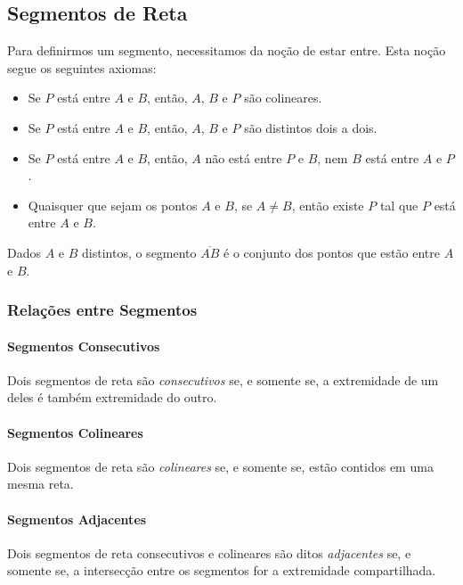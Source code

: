 \subsection{Segmentos de Reta}
Para definirmos um segmento, necessitamos da noção de estar entre. Esta noção segue os seguintes axiomas: \par 
\begin{itemize}
\item Se $P$ está entre $A$ e $B$, então, $A$, $B$ e $P$ são colineares.
\item Se $P$ está entre $A$ e $B$, então, $A$, $B$ e $P$ são distintos dois a dois.
\item Se $P$ está entre $A$ e $B$, então, $A$ não está entre $P$ e $B$, nem $B$ está entre $A$ e $P$.
\item Quaisquer que sejam os pontos $A$ e $B$, se $A \neq B$, então existe $P$ tal que $P$ está entre $A$ e $B$.
\end{itemize}
\begin{df}
Dados $A$ e $B$ distintos, o segmento $\overline{AB}$ é o conjunto dos pontos que estão entre $A$ e $B$.
\end{df}
	\subsubsection{Relações entre Segmentos}
    \paragraph{Segmentos Consecutivos}
    \begin{df}
    Dois segmentos de reta são \emph{consecutivos} se, e somente se, a extremidade de um deles é também extremidade do outro. \end{df}
    \paragraph{Segmentos Colineares}
    \begin{df}
    Dois segmentos de reta são \emph{colineares} se, e somente se, estão contidos em uma mesma reta. \end{df}
    \paragraph{Segmentos Adjacentes}
    \begin{df}
    Dois segmentos de reta consecutivos e colineares são ditos \emph{adjacentes} se, e somente se, a intersecção entre os segmentos for a extremidade compartilhada. \end{df}
